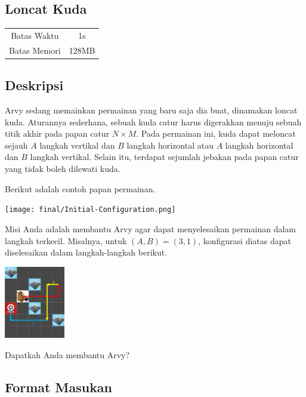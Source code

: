 \documentclass{article}
\begin{document}
\begin{center}
    \section*{Loncat Kuda} %

    \begin{tabular}{ | c c | }
        \hline
        Batas Waktu  & 1s \\    %
        Batas Memori & 128MB \\  %
        \hline
    \end{tabular}
\end{center}

\subsection*{Deskripsi}

Arvy sedang memainkan permainan yang baru saja dia buat, dinamakan loncat kuda. 
Aturannya sederhana, sebuah kuda catur harus digerakkan menuju sebuah titik akhir pada papan catur $N \times M$.
Pada permainan ini, kuda dapat meloncat sejauh $A$ langkah vertikal dan $B$ langkah horizontal atau $A$ langkah horizontal dan $B$ langkah vertikal.
Selain itu, terdapat sejumlah jebakan pada papan catur yang tidak boleh dilewati kuda.

Berikut adalah contoh papan permainan.

\begin{center}
    \texttt{[image: final/Initial-Configuration.png]}    
\end{center}


Misi Anda adalah membantu Arvy agar dapat menyelesaikan permainan dalam langkah terkecil.
Misalnya, untuk $(A,B)=(3,1)$, konfigurasi diatas dapat diselesaikan dalam langkah-langkah berikut.

\begin{center}
    \includegraphics[width=100px]{Movelist}
\end{center}

Dapatkah Anda membantu Arvy?

\subsection*{Format Masukan}
\end{document}
